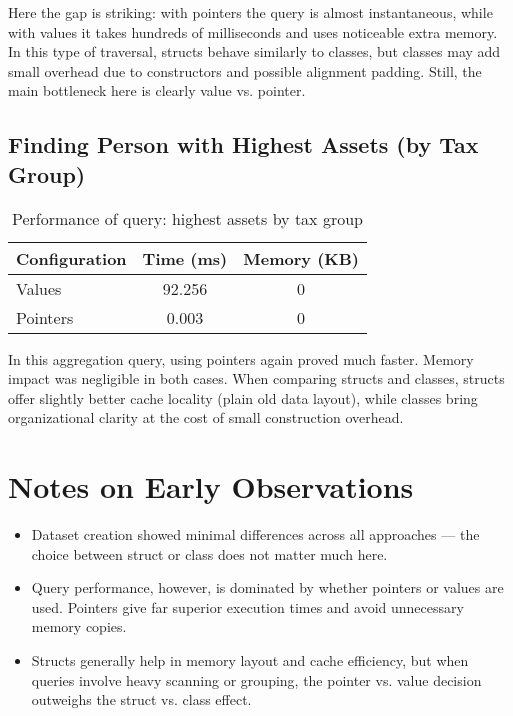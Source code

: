 \documentclass[11pt,letterpaper,oneside]{article}
\begin{document}
Here the gap is striking: with pointers the query is almost instantaneous, while
with values it takes hundreds of milliseconds and uses noticeable extra memory.
In this type of traversal, structs behave similarly to classes, but classes may
add small overhead due to constructors and possible alignment padding. Still,
the main bottleneck here is clearly value vs. pointer.

\subsection{Finding Person with Highest Assets (by Tax Group)}

\begin{table}[h!]
\centering
\begin{tabular}{|l|c|c|}
\hline
\textbf{Configuration} & \textbf{Time (ms)} & \textbf{Memory (KB)} \\
\hline
Values   & 92.256 & 0 \\
Pointers & 0.003 & 0 \\
\hline
\end{tabular}
\caption{Performance of query: highest assets by tax group}
\end{table}

In this aggregation query, using pointers again proved much faster. Memory
impact was negligible in both cases. When comparing structs and classes, structs
offer slightly better cache locality (plain old data layout), while classes
bring organizational clarity at the cost of small construction overhead.

\section{Notes on Early Observations}

\begin{itemize}
    \item Dataset creation showed minimal differences across all approaches —
    the choice between struct or class does not matter much here.
    \item Query performance, however, is dominated by whether pointers or values
    are used. Pointers give far superior execution times and avoid unnecessary
    memory copies.
    \item Structs generally help in memory layout and cache efficiency, but when
    queries involve heavy scanning or grouping, the pointer vs. value decision
    outweighs the struct vs. class effect.
\end{itemize}
\end{document}
